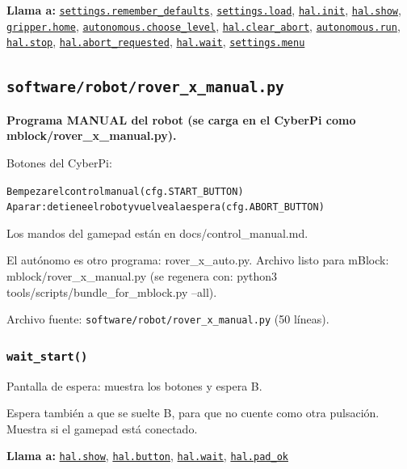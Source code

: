 \noindent\textbf{Llama a:} \hyperref[fn:settings:remember-defaults]{\texttt{settings.remember\_\allowbreak{}defaults}}, \hyperref[fn:settings:load]{\texttt{settings.load}}, \hyperref[fn:hal:init]{\texttt{hal.init}}, \hyperref[fn:hal:show]{\texttt{hal.show}}, \hyperref[fn:gripper:home]{\texttt{gripper.home}}, \hyperref[fn:autonomous:choose-level]{\texttt{autonomous.choose\_\allowbreak{}level}}, \hyperref[fn:hal:clear-abort]{\texttt{hal.clear\_\allowbreak{}abort}}, \hyperref[fn:autonomous:run]{\texttt{autonomous.run}}, \hyperref[fn:hal:stop]{\texttt{hal.stop}}, \hyperref[fn:hal:abort-requested]{\texttt{hal.abort\_\allowbreak{}requested}}, \hyperref[fn:hal:wait]{\texttt{hal.wait}}, \hyperref[fn:settings:menu]{\texttt{settings.menu}}\par

\subsection{\texttt{software/robot/rover\_\allowbreak{}x\_\allowbreak{}manual.py}}\label{mod:rover-x-manual}
\textbf{Programa MANUAL del robot (se carga en el CyberPi como mblock/rover\_x\_manual.py).}

Botones del CyberPi:

{\small\begin{alltt}
B   empezar el control manual (cfg.START\_BUTTON)
A   parar: detiene el robot y vuelve a la espera (cfg.ABORT\_BUTTON)
\end{alltt}}
Los mandos del gamepad están en docs/control\_manual.md.

El autónomo es otro programa: rover\_x\_auto.py. Archivo listo para mBlock: mblock/rover\_x\_manual.py (se regenera con: python3 tools/scripts/bundle\_for\_mblock.py --all).

\noindent Archivo fuente: \texttt{software/robot/rover\_\allowbreak{}x\_\allowbreak{}manual.py} (50 l\'ineas).

\subsubsection{\texttt{wait\_\allowbreak{}start()}}\label{fn:rover_x_manual:wait-start}
\noindent Pantalla de espera: muestra los botones y espera B.

Espera también a que se suelte B, para que no cuente como otra pulsación. Muestra si el gamepad está conectado.

\noindent\textbf{Llama a:} \hyperref[fn:hal:show]{\texttt{hal.show}}, \hyperref[fn:hal:button]{\texttt{hal.button}}, \hyperref[fn:hal:wait]{\texttt{hal.wait}}, \hyperref[fn:hal:pad-ok]{\texttt{hal.pad\_\allowbreak{}ok}}\par

